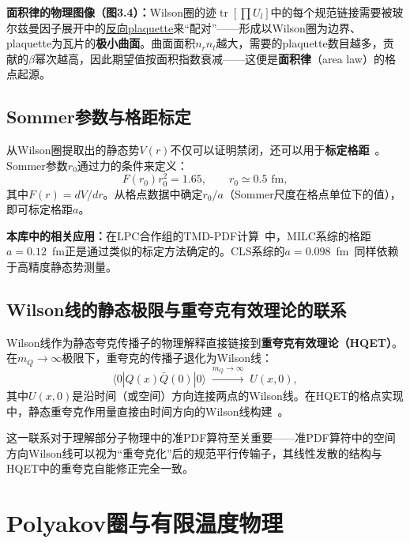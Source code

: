 \documentclass[12pt,a4paper]{ctexart}
\theoremstyle{definition}
\begin{document}
\textbf{面积律的物理图像（图3.4）：}Wilson圈的迹$\operatorname{tr}[\prod U_l]$中的每个规范链接需要被玻尔兹曼因子展开中的\underline{反向plaquette}来``配对''——形成以Wilson圈为边界、plaquette为瓦片的\textbf{极小曲面}。曲面面积$n_r n_t$越大，需要的plaquette数目越多，贡献的$\beta$幂次越高，因此期望值按面积指数衰减——这便是\textbf{面积律}（area law）的格点起源。

\subsection{Sommer参数与格距标定}

从Wilson圈提取出的静态势$V(r)$不仅可以证明禁闭，还可以用于\textbf{标定格距}~\cite{GattringerLang2010}。Sommer参数$r_0$通过力的条件来定义：
\begin{equation}
F(r_0) r_0^2 = 1.65, \qquad r_0 \simeq 0.5\text{~fm},
\label{eq:sommer_parameter}
\end{equation}
其中$F(r) = dV/dr$。从格点数据中确定$r_0/a$（Sommer尺度在格点单位下的值），即可标定格距$a$。

\textbf{本库中的相关应用：}在LPC合作组的TMD-PDF计算~\cite{He2024unpolTMD}中，MILC系综的格距$a=0.12$~fm正是通过类似的标定方法确定的。CLS系综的$a=0.098$~fm~\cite{Chu2023soft}同样依赖于高精度静态势测量。

\subsection{Wilson线的静态极限与重夸克有效理论的联系}

Wilson线作为静态夸克传播子的物理解释直接链接到\textbf{重夸克有效理论（HQET）}。在$m_Q\to\infty$极限下，重夸克的传播子退化为Wilson线：
\begin{equation}
\langle 0| Q(x) \bar Q(0) |0 \rangle \;\xrightarrow{m_Q\to\infty}\; U(x,0),
\end{equation}
其中$U(x,0)$是沿时间（或空间）方向连接两点的Wilson线。在HQET的格点实现中，静态重夸克作用量直接由时间方向的Wilson线构建~\cite{GattringerLang2010}。

这一联系对于理解部分子物理中的准PDF算符至关重要——准PDF算符中的空间方向Wilson线可以视为``重夸克化''后的规范平行传输子，其线性发散的结构与HQET中的重夸克自能修正完全一致。

\section{Polyakov圈与有限温度物理}
\end{document}
